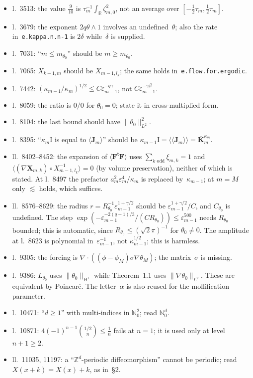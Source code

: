 \documentclass[11pt]{amsart}
\newcommand{\ep}{\varepsilon}
\newcommand{\R}{\mathbb{R}}
\newcommand{\Z}{\mathbb{Z}}
\newcommand{\N}{\mathbb{N}}
\newcommand{\Id}{\mathrm{I}}
\newcommand{\K}{\mathbf{K}}
\newcommand{\J}{\mathbf{J}}
\newcommand{\F}{\mathbf{F}}
\newcommand{\Chi}{\mathbf{X}}
\newcommand{\Ln}[1]{l.~#1}
\newcommand{\Lns}[1]{ll.~#1}
\newcommand{\lab}[1]{\texttt{#1}}
\theoremstyle{remark}
\begin{document}
\begin{itemize}
\item \Ln{3513}: the value $\frac9{10}$ is $\tau_m^{-1}\int_\R\zeta_{m,0}^2$, not an average over $[-\frac12\tau_m,\frac12\tau_m]$.
\item \Ln{3679}: the exponent $2q\theta\wedge1$ involves an undefined~$\theta$; also the rate in~\lab{e.kappa.n.n-1} is $2\delta$ while~$\delta$ is supplied.
\item \Ln{7031}: ``$m\leq m_{\theta_0}$'' should be $m\geq m_{\theta_0}$.
\item \Ln{7065}: $X_{k-1,m}$ should be $X_{m-1,l_k}$; the same holds in~\lab{e.flow.for.ergodic}.
\item \Ln{7442}: $(\kappa_{m-1}/\kappa_m)^{1/2}\leq C\ep_{m-1}^{-q\gamma}$, not $C\ep_{m-1}^{-\gamma\beta}$.
\item \Ln{8059}: the ratio is $0/0$ for $\theta_0=0$; state it in cross-multiplied form.
\item \Ln{8104}: the last bound should have $\|\theta_0\|_{L^2}^2$.
\item \Ln{8395}: ``$\kappa_m\Id$ is equal to $\langle\J_m\rangle$'' should be $\kappa_{m-1}\Id=\langle\!\langle\J_m\rangle\!\rangle=\overline{\K}^{\kappa_m}_m$.
\item \Lns{8402--8452}: the expansion of $\langle\F^{\mathsf t}\F\rangle$ uses $\sum_{k\text{ odd}}\xi_{m,k}=1$ and $\langle(\nabla\Chi_{m,k})\circ X^{-1}_{m-1,l_k}\rangle=0$ (by volume preservation), neither of which is stated. At \Ln{8497} the prefactor $a_m^2\ep_m^4/\kappa_m$ is replaced by~$\kappa_{m-1}$; at $m=M$ only $\lesssim$ holds, which suffices.
\item \Lns{8576--8629}: the radius $r=R_{\theta_0}^{-1}\ep_{m-1}^{1+\gamma/2}$ should be $\ep_{m-1}^{1+\gamma/2}/C$, and $C_{\theta_0}$ is undefined. The step $\exp(-\ep_{m-1}^{-2(q-1)/3}/(CR_{\theta_0}))\leq\ep_{m-1}^{500}$ needs $R_{\theta_0}$ bounded; this is automatic, since $R_{\theta_0}\leq(\sqrt2\pi)^{-1}$ for $\theta_0\neq0$. The amplitude at \Ln{8623} is polynomial in~$\ep_{m-1}^{-1}$, not $\kappa_{m-1}^{1/2}$; this is harmless.
\item \Ln{9305}: the forcing is $\nabla\cdot((\phi-\phi_M)\sigma\nabla\theta_M)$; the matrix~$\sigma$ is missing.
\item \Ln{9386}: $L_{\theta_0}$ uses $\|\theta_0\|_{H^1}$ while Theorem~1.1 uses $\|\nabla\theta_0\|_{L^2}$. These are equivalent by Poincaré. The letter~$\alpha$ is also reused for the mollification parameter.
\item \Ln{10471}: ``$d\geq1$'' with multi-indices in $\N_0^2$; read $\N_0^d$.
\item \Ln{10871}: $4(-1)^{n-1}\binom{1/2}{n}\leq\frac1n$ fails at $n=1$; it is used only at level $n+1\geq2$.
\item \Lns{11035, 11197}: a ``$\Z^d$-periodic diffeomorphism'' cannot be periodic; read $X(x+k)=X(x)+k$, as in~\S2.
\end{itemize}
\end{document}
